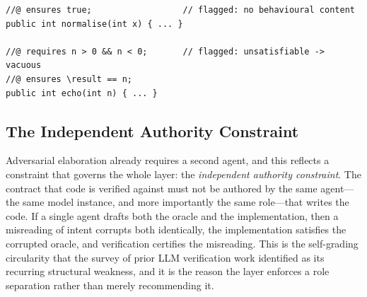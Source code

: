 \begin{lstlisting}[style=code,caption={Vacuity patterns flagged by non-triviality checks: a postcondition equivalent to \texttt{true} (no constraint) and an unsatisfiable precondition (vacuously dischargeable).},label={lst:vacuity}]
//@ ensures true;                  // flagged: no behavioural content
public int normalise(int x) { ... }

//@ requires n > 0 && n < 0;       // flagged: unsatisfiable -> vacuous
//@ ensures \result == n;
public int echo(int n) { ... }
\end{lstlisting}

\subsection{The Independent Authority Constraint}
\label{subsec:independent_authority}

Adversarial elaboration already requires a second agent, and this reflects a constraint that governs the whole layer: the \emph{independent authority constraint}. The contract that code is verified against must not be authored by the same agent---the same model instance, and more importantly the same role---that writes the code. If a single agent drafts both the oracle and the implementation, then a misreading of intent corrupts both identically, the implementation satisfies the corrupted oracle, and verification certifies the misreading. This is the self-grading circularity that the survey of prior LLM verification work identified as its recurring structural weakness, and it is the reason the layer enforces a role separation rather than merely recommending it.

